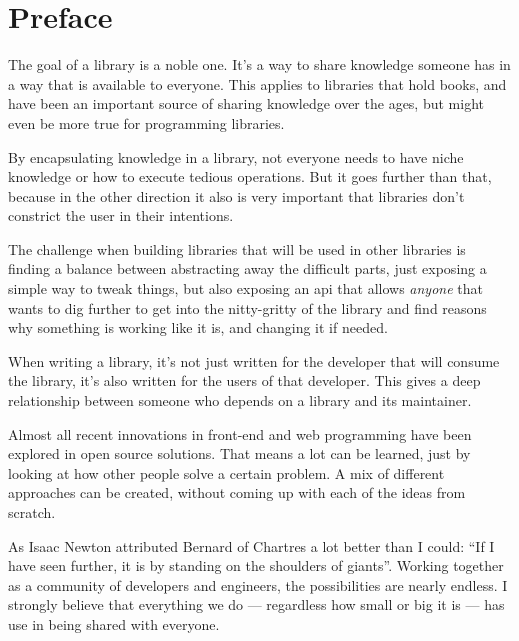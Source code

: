 
\chapter{Preface}%
\label{chp:preface}

The goal of a \gls{library} is a noble one. It's a way to share knowledge someone has in a way that is available to everyone. This applies to libraries that hold books, and have been an important source of sharing knowledge over the ages, but might even be more true for programming libraries. 

By encapsulating knowledge in a \gls{library}, not everyone needs to have niche knowledge or how to execute tedious operations. But it goes further than that, because in the other direction it also is very important that libraries don't constrict the user in their intentions.

The challenge when building libraries that will be used in other libraries is finding a balance between abstracting away the difficult parts, just exposing a simple way to tweak things, but also exposing an \acrshort{api} that allows \emph{anyone} that wants to dig further to get into the nitty-gritty of the \gls{library} and find reasons why something is working like it is, and changing it if needed.

When writing a \gls{library}, it's not just written for the developer that will consume the library, it's also written for the users of that developer. This gives a deep relationship between someone who depends on a \gls{library} and its maintainer.

Almost all recent innovations in front-end and web programming have been explored in open source solutions. That means a lot can be learned, just by looking at how other people solve a certain problem. A mix of different approaches can be created, without coming up with each of the ideas from scratch. 

As Isaac Newton\cite{newton-giants} attributed Bernard of Chartres\cite{quote-giants-source} a lot better than I could: ``If I have seen further, it is by standing on the shoulders of giants''. Working together as a community of developers and engineers, the possibilities are nearly endless. I strongly believe that everything we do --- regardless how small or big it is --- has use in being shared with everyone.
